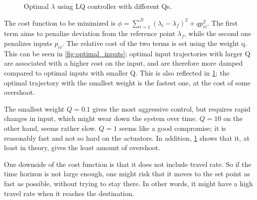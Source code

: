 \begin{figure}[H]

    \centering


    \caption{Optimal $\lambda$ using LQ controller with different Qs.}

    \label{fig:optimal_lambda}

\end{figure}



The cost function to be minimized is $\phi = \sum_{i=1}^{N} (\lambda_i-\lambda_f)^2 + qp_{ci}^2$. The first term aims to penalize deviation from the reference point $\lambda_f$, while the second one penalizes inputs $p_{ci}$. The relative cost of the two terms is set using the weight q. This can be seen in \cref{fig:optimal_inputs}; optimal input trajectories with larger Q are associated with a higher cost on the input, and are therefore more damped compared to optimal inputs with smaller Q. This is also reflected in \cref{fig:optimal_lambda}; the optimal trajectory with the smallest weight is the fastest one, at the cost of some overshoot.



The smallest weight $Q=0.1$ gives the most aggressive control, but requires rapid changes in input, which might wear down the system over time. $Q=10$ on the other hand, seems rather slow. $Q=1$ seems like a good compromise; it is reasonably fast and not so hard on the actuators. In addition, \cref{fig:optimal_lambda} shows that it, at least in theory, gives the least amount of overshoot.



One downside of the cost function is that it does not include travel rate. So if the time horizon is not large enough, one might risk that it moves to the set point as fast as possible, without trying to stay there. In other words, it might have a high travel rate when it reaches the destination.



